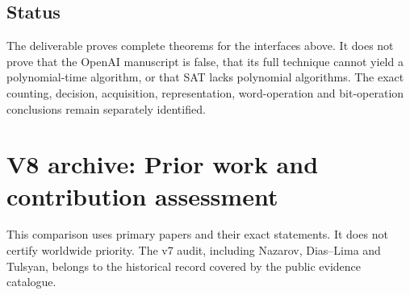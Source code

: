 \documentclass[
  11pt,
]{article}
\begin{document}
\subsection{Status}\label{v8-status}

The deliverable proves complete theorems for the interfaces above. It
does not prove that the OpenAI manuscript is false, that its full
technique cannot yield a polynomial-time algorithm, or that SAT lacks
polynomial algorithms. The exact counting, decision, acquisition,
representation, word-operation and bit-operation conclusions remain
separately identified.

\section{V8 archive: Prior work and contribution assessment}\label{v8-section-contribution-audit}

This comparison uses primary papers and their exact statements. It does
not certify worldwide priority. The v7 audit, including Nazarov,
Dias--Lima and Tulsyan, belongs to the historical record covered
by the public evidence catalogue.
\end{document}
